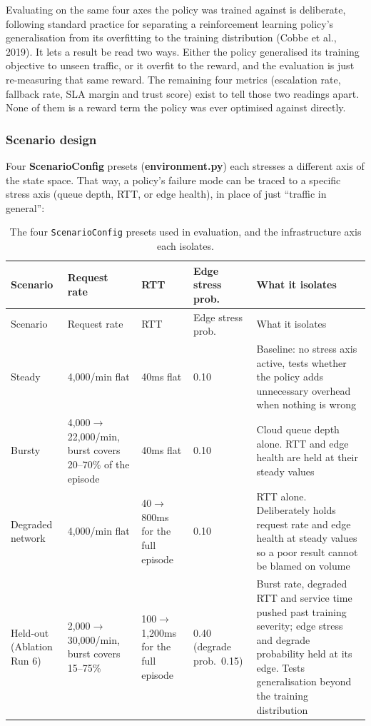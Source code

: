Evaluating on the same four axes the policy was trained against is
deliberate, following standard practice for separating a reinforcement
learning policy's generalisation from its overfitting to the training
distribution (Cobbe et al., 2019). It lets a result be read two ways.
Either the policy generalised its training objective to unseen traffic,
or it overfit to the reward, and the evaluation is just re-measuring
that same reward.
The remaining four metrics (escalation rate, fallback rate, SLA margin
and trust score) exist to tell those two readings apart. None of them
is a reward term the policy was ever optimised against directly.

\hypertarget{scenario-design}{%
\subsubsection{Scenario design}\label{scenario-design}}

Four \textbf{ScenarioConfig} presets (\textbf{environment.py}) each
stresses a different axis of the state space. That way, a policy's
failure mode can be traced to a specific stress axis (queue depth,
RTT, or edge health), in place of just ``traffic in general'':

{\small\setlength{\tabcolsep}{4pt}
\begin{longtable}{p{1.9cm}p{2.3cm}p{2.2cm}p{1.4cm}p{3.4cm}} \caption{The
four \texttt{ScenarioConfig} presets used in evaluation, and the
infrastructure axis each isolates.}\label{tab:scenarios}\\ \toprule
Scenario & Request rate & RTT & Edge stress prob. & What it isolates \\
\midrule \endfirsthead \toprule
Scenario & Request rate & RTT & Edge stress prob. & What it isolates \\
\midrule \endhead Steady & 4,000/min flat & 40ms flat & 0.10 & Baseline:
no stress axis active, tests whether the policy adds unnecessary
overhead when nothing is wrong \\ Bursty & 4,000$\to$22,000/min, burst
covers 20--70\% of the episode & 40ms flat & 0.10 & Cloud queue depth
alone. RTT and edge health are held at their steady values \\ Degraded
network & 4,000/min flat & 40$\to$800ms for the full episode & 0.10 &
RTT alone. Deliberately holds request rate and edge health at steady
values so a poor result cannot be blamed on volume \\ Held-out (Ablation
Run 6) & 2,000$\to$30,000/min, burst covers 15--75\% & 100$\to$1,200ms
for the full episode & 0.40 (degrade prob.\ 0.15) & Burst rate,
degraded RTT and service time pushed past training severity; edge
stress and degrade probability held at its edge. Tests generalisation
beyond the training distribution \\ \bottomrule \end{longtable} }

